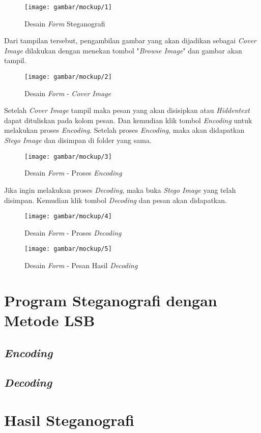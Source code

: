 	\begin{figure}[H]
		\centering
		\texttt{[image: gambar/mockup/1]}
		\caption{Desain \emph{Form} Steganografi}
		\label{desain_form}
	\end{figure}

	Dari tampilan tersebut, pengambilan gambar yang akan dijadikan sebagai \emph{Cover Image} dilakukan dengan menekan tombol "\emph{Browse Image}" dan gambar akan tampil. 
	
	\begin{figure}[H]
		\centering
		\texttt{[image: gambar/mockup/2]}
		\caption{Desain \emph{Form} - \emph{Cover Image}}
		\label{desain_image}
	\end{figure}

	Setelah \emph{Cover Image} tampil maka pesan yang akan disisipkan atau \emph{Hiddentext} dapat dituliskan pada kolom pesan. Dan kemudian klik tombol \emph{Encoding} untuk melakukan proses \emph{Encoding}. Setelah proses \emph{Encoding}, maka akan didapatkan \emph{Stego Image} dan disimpan di folder yang sama.
	
	\begin{figure}[H]
		\centering
		\texttt{[image: gambar/mockup/3]}
		\caption{Desain \emph{Form} - Proses \emph{Encoding}}
		\label{desain_encoding}
	\end{figure}

	Jika ingin melakukan proses \emph{Decoding}, maka buka \emph{Stego Image} yang telah disimpan. Kemudian klik tombol \emph{Decoding} dan pesan akan didapatkan.
	
	\begin{figure}[H]
		\centering
		\texttt{[image: gambar/mockup/4]}
		\caption{Desain \emph{Form} - Proses \emph{Decoding}}
		\label{desain_decoding}
	\end{figure}

	\begin{figure}[H]
		\centering
		\texttt{[image: gambar/mockup/5]}
		\caption{Desain \emph{Form} - Pesan Hasil \emph{Decoding}}
		\label{desain_pesan}
	\end{figure}

\section{Program Steganografi dengan Metode LSB}
	\subsection{\emph{Encoding}}
	\subsection{\emph{Decoding}}
	
\section{Hasil Steganografi}